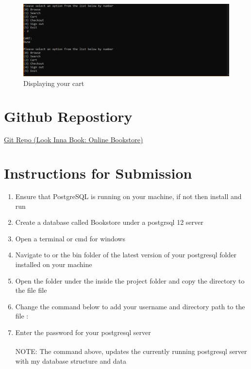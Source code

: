 \documentclass[a4 paper]{article}
\begin{document}
\begin{figure}
\centering 
\includegraphics[width=\textwidth/1]{scenarios_cmd/cart.png}
\caption{Displaying your cart}
\end{figure}
\section{Github Repostiory}
\href{https://github.com/WalterMitty2112/Online-Bookstore-Webapp}{Git Repo (Look Inna Book: Online Bookstore)}
\section{Instructions for Submission}
\begin{enumerate}
\item Ensure that PostgreSQL is running on your machine, if not then install and run 
\item Create a database called Bookstore under a postgrsql 12 server
\item Open a terminal or cmd for windows
\item Navigate to  or the bin folder of the latest version of your postgresql folder installed on your machine
\item Open the folder  under the  inside the project folder and copy the directory to the file  file
\item Change the command below to add your username and directory path to the file : \\
\item Enter the password for your postgresql server\\\\
NOTE: The command above, updates the currently running postgresql server with my database structure and data
\end{enumerate}
\end{document}
